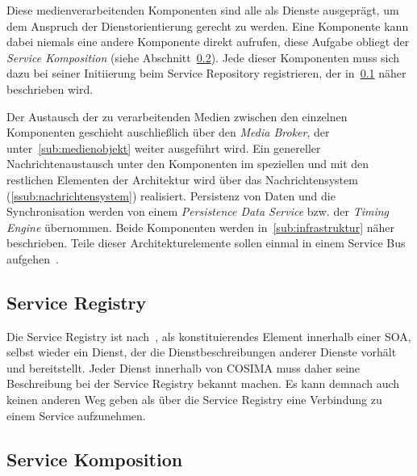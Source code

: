   Diese medienverarbeitenden Komponenten sind alle als Dienste ausgeprägt, um dem Anspruch der Dienstorientierung gerecht zu werden. Eine Komponente kann dabei niemals eine andere Komponente direkt aufrufen, diese Aufgabe obliegt der \emph{Service Komposition} (siehe Abschnitt~\ref{sub:service_komposition}). Jede dieser Komponenten muss sich dazu bei seiner Initiierung beim Service Repository registrieren, der in~\ref{sub:service_registry} näher beschrieben wird.
  
  Der Austausch der zu verarbeitenden Medien zwischen den einzelnen Komponenten geschieht auschließlich über den \emph{Media Broker}, der unter~\ref{sub:medienobjekt} weiter ausgeführt wird. Ein genereller Nachrichtenaustausch unter den Komponenten im speziellen und mit den restlichen Elementen der Architektur wird über das Nachrichtensystem (\ref{ssub:nachrichtensystem}) realisiert. Persistenz von Daten und die Synchronisation werden von einem \emph{Persistence Data Service} bzw. der \emph{Timing Engine} übernommen. Beide Komponenten werden in~\ref{sub:infrastruktur} näher beschrieben. Teile dieser Architekturelemente sollen einmal in einem Service Bus aufgehen~\citep[S. 18]{bericht}.


\subsection{Service Registry} %
\label{sub:service_registry}

  Die Service Registry ist nach~\citep{service_oriented_computing}, als konstituierendes Element innerhalb einer SOA, selbst wieder ein Dienst, der die Dienstbeschreibungen anderer Dienste vorhält und bereitstellt. Jeder Dienst innerhalb von COSIMA muss daher seine Beschreibung bei der Service Registry bekannt machen. Es kann demnach auch keinen anderen Weg geben als über die Service Registry eine Verbindung zu einem Service aufzunehmen.



\subsection{Service Komposition} %
\label{sub:service_komposition}


